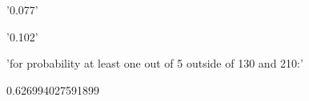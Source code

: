 \documentclass[11pt]{article}
\begin{document}
    '0.077'

    
    '0.102'

    
    'for probability at least one out of 5 outside of 130 and 210:'

    
    0.626994027591899

    

    
    
    
    
\end{document}
